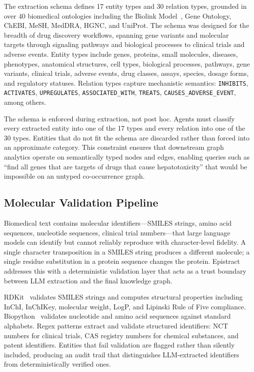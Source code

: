 The extraction schema defines 17 entity types and 30 relation types, grounded in over 40 biomedical ontologies including the Biolink Model~\cite{biolink2022}, Gene Ontology, ChEBI, MeSH, MedDRA, HGNC, and UniProt. The schema was designed for the breadth of drug discovery workflows, spanning gene variants and molecular targets through signaling pathways and biological processes to clinical trials and adverse events. Entity types include genes, proteins, small molecules, diseases, phenotypes, anatomical structures, cell types, biological processes, pathways, gene variants, clinical trials, adverse events, drug classes, assays, species, dosage forms, and regulatory statuses. Relation types capture mechanistic semantics: \texttt{INHIBITS}, \texttt{ACTIVATES}, \texttt{UPREGULATES}, \texttt{ASSOCIATED\_WITH}, \texttt{TREATS}, \texttt{CAUSES\_ADVERSE\_EVENT}, among others.

The schema is enforced during extraction, not post hoc. Agents must classify every extracted entity into one of the 17 types and every relation into one of the 30 types. Entities that do not fit the schema are discarded rather than forced into an approximate category. This constraint ensures that downstream graph analytics operate on semantically typed nodes and edges, enabling queries such as ``find all genes that are targets of drugs that cause hepatotoxicity'' that would be impossible on an untyped co-occurrence graph.

\subsection{Molecular Validation Pipeline}

Biomedical text contains molecular identifiers---SMILES strings, amino acid sequences, nucleotide sequences, clinical trial numbers---that large language models can identify but cannot reliably reproduce with character-level fidelity. A single character transposition in a SMILES string produces a different molecule; a single residue substitution in a protein sequence changes the protein. Epistract addresses this with a deterministic validation layer that acts as a trust boundary between LLM extraction and the final knowledge graph.

RDKit~\cite{rdkit2024} validates SMILES strings and computes structural properties including InChI, InChIKey, molecular weight, LogP, and Lipinski Rule of Five compliance. Biopython~\cite{biopython2009} validates nucleotide and amino acid sequences against standard alphabets. Regex patterns extract and validate structured identifiers: NCT numbers for clinical trials, CAS registry numbers for chemical substances, and patent identifiers. Entities that fail validation are flagged rather than silently included, producing an audit trail that distinguishes LLM-extracted identifiers from deterministically verified ones.

